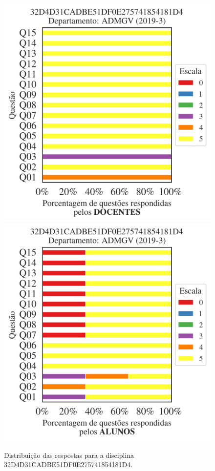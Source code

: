 \documentclass[a4paper,10pt]{article}
\begin{document}
\begin{figure}[h]
\centering
\includegraphics[width=0.485\linewidth]{analise_disciplina_departamento_ADMGV_32D4D31CADBE51DF0E275741854181D4_docentes.png}
\includegraphics[width=0.485\linewidth]{analise_disciplina_departamento_ADMGV_32D4D31CADBE51DF0E275741854181D4_alunos.png}
\caption{\label{fig:analise_geral_departamento}                Distribuição das respostas para a disciplina 32D4D31CADBE51DF0E275741854181D4. }
\end{figure}
\end{document}
